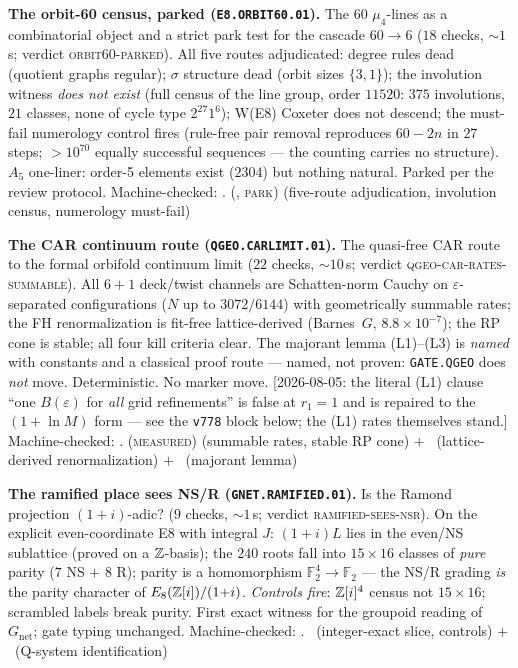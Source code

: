 \par\smallskip\noindent\textbf{The orbit-60 census, parked
(\texttt{E8.ORBIT60.01}).}
The $60$ $\mu_4$-lines as a combinatorial object and a strict park
test for the cascade $60\to6$ ($18$ checks, ${\sim}1$\,s; verdict
\textsc{orbit60-parked}).  All five routes adjudicated: degree rules
dead (quotient graphs regular); $\sigma$ structure dead (orbit sizes
$\{3,1\}$); the involution witness \emph{does not exist} (full
census of the line group, order $11520$: $375$ involutions, $21$
classes, none of cycle type $2^{27}1^6$); W(E8) Coxeter does not
descend; the must-fail numerology control fires (rule-free pair
removal reproduces $60-2n$ in $27$ steps; $>10^{70}$ equally
successful sequences --- the counting carries no structure).  $A_5$
one-liner: order-5 elements exist ($2304$) but nothing natural.
Parked per the review protocol.
Machine-checked: .
(\mE, \textsc{park}) (five-route adjudication, involution census,
numerology must-fail)
\par\smallskip

\par\smallskip\noindent\textbf{The CAR continuum route
(\texttt{QGEO.CARLIMIT.01}).}
The quasi-free CAR route to the formal orbifold continuum limit
($22$ checks, ${\sim}10$\,s; verdict
\textsc{qgeo-car-rates-summable}).  All $6{+}1$ deck/twist channels
are Schatten-norm Cauchy on $\varepsilon$-separated configurations
($N$ up to $3072/6144$) with geometrically summable rates; the FH
renormalization is fit-free lattice-derived (Barnes~$G$,
$8.8\times10^{-7}$); the RP cone is stable; all four kill criteria
clear.  The majorant lemma (L1)--(L3) is \emph{named} with constants
and a classical proof route --- named, not proven:
\texttt{GATE.QGEO} does \emph{not} move.  Deterministic.  No marker
move.  [2026-08-05: the literal (L1) clause ``one $B(\varepsilon)$
for \emph{all} grid refinements'' is false at $r_1=1$ and is
repaired to the $(1+\ln M)$ form --- see the \texttt{v778} block
below; the (L1) rates themselves stand.]
Machine-checked: .
(\textsc{measured}) (summable rates, stable RP cone) $+$ \mE\
(lattice-derived renormalization) $+$ \mO\ (majorant lemma)
\par\smallskip

\par\smallskip\noindent\textbf{The ramified place sees NS/R
(\texttt{GNET.RAMIFIED.01}).}
Is the Ramond projection $(1{+}i)$-adic? ($9$ checks, ${\sim}1$\,s;
verdict \textsc{ramified-sees-nsr}).  On the explicit
even-coordinate E8 with integral $J$: $(1{+}i)L$ lies in the even/NS
sublattice (proved on a $\mathbb{Z}$-basis); the $240$ roots fall into
$15\times16$ classes of \emph{pure} parity ($7$ NS $+$ $8$ R);
parity is a homomorphism $\mathbb F_2^4\to\mathbb F_2$ --- the NS/R
grading \emph{is} the parity character of $E_8(\mathbb{Z}[i])/(1{+}i)$.
\emph{Controls fire}: $\mathbb{Z}[i]^4$ census not $15\times16$; scrambled
labels break purity.  First exact witness for the groupoid reading
of $G_{\mathrm{net}}$; gate typing unchanged.
Machine-checked: .
\mE\ (integer-exact slice, controls) $+$ \mO\ (Q-system
identification)
\par\smallskip


